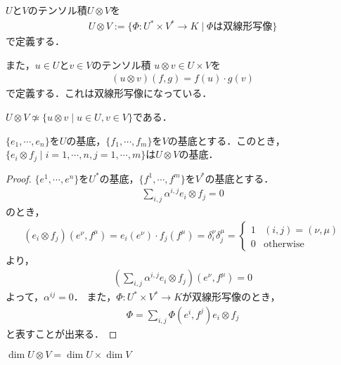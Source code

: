 \documentclass[uplatex]{jsarticle}
\begin{document}
\sukima{}
\begin{teigi}[テンソル積]
  $U$と$V$のテンソル積$U\otimes V$を
  \begin{align*}
    U\otimes V := \{ \Phi \colon U^\ast \times V^\ast \to K \mid \Phi\mbox{は双線形写像} \}
  \end{align*}
  で定義する．

  また，$u\in U$と$v\in V$のテンソル積 $u\otimes v\in U\times V$を
  \begin{align*}
    (u\otimes v)(f,g) = f(u)\cdot g(v)
  \end{align*}
  で定義する．これは双線形写像になっている．
\end{teigi}
\begin{remark}
  $U\otimes V \not \simeq \{ u\otimes v \mid u \in U, v \in V\}$である．
\end{remark}
\begin{prop}
  $\{e_1,\cdots,e_n\}$を$U$の基底，$\{f_1,\cdots,f_m\}$を$V$の基底とする．このとき，$\{e_i\otimes f_j \mid i=1,\cdots,n,j=1,\cdots,m \}$は$U\otimes V$の基底．
\end{prop}
\begin{proof}
  $\{e^1,\cdots,e^n\}$を$U^\ast$の基底，$\{f^1,\cdots,f^m\}$を$V^\ast$の基底とする．
  \begin{align*}
    \sum_{i,j} \alpha^{i,j} e_i \otimes f_j = 0
  \end{align*}
  のとき，
  \begin{align*}
    (e_i\otimes f_j)(e^\nu ,f^\mu) = e_i(e^\nu)\cdot f_j(f^\mu) 
    = \delta_i^\nu \delta_j^\mu = \begin{cases}
      1 & (i,j) = (\nu,\mu) \\
      0 & \mathrm{otherwise}
    \end{cases}
  \end{align*}
  より，
  \begin{align*}
    \left(\sum_{i,j} \alpha^{i,j} e_i \otimes f_j \right) (e^\nu,f^\mu) = 0
  \end{align*}
  よって，$\alpha^{i j} = 0$．
  また，$\Phi \colon U^\ast \times V^\ast \to K$が双線形写像のとき，
  \begin{align*}
    \Phi = \sum_{i,j} \Phi(e^i,f^j) e_i \otimes f_j
  \end{align*}
  と表すことが出来る．
\end{proof}
\begin{corr}
  $\dim U\otimes V = \dim U \times \dim V$
\end{corr}
\end{document}
